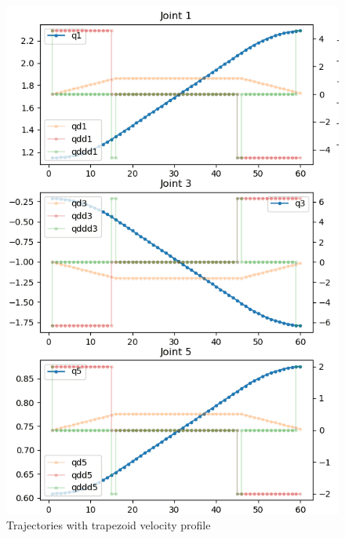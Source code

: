 \begin{frame}
\begin{columns}
\begin{center}
\begin{figure}[H]
\centering
\includegraphics[width=\textwidth]{../images/robot_planner3/3f_trapezoid1_half.png}
\caption{Trajectories with trapezoid velocity profile}
\end{figure}
\end{center}


\end{columns}
\end{frame}
